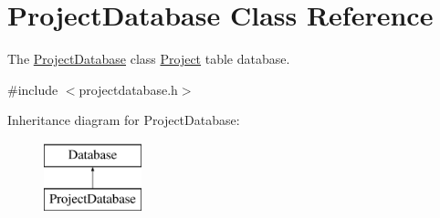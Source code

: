 \hypertarget{classProjectDatabase}{\section{Project\+Database Class Reference}
\label{classProjectDatabase}
}


The \hyperlink{classProjectDatabase}{Project\+Database} class \hyperlink{classProject}{Project} table database.  




{\ttfamily \#include $<$projectdatabase.\+h$>$}

Inheritance diagram for Project\+Database\+:\begin{figure}[H]
\begin{center}
\leavevmode
\includegraphics[height=2.000000cm]{d4/d8d/classProjectDatabase}
\end{center}
\end{figure}
